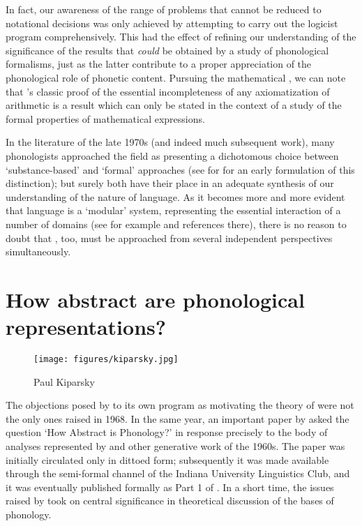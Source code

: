 In fact, our awareness of the range of problems that cannot be reduced
to notational decisions was only achieved by attempting to carry out
the logicist program comprehensively. This had the effect of refining
our understanding of the significance of the results that \emph{could}
be obtained by a study of phonological formalisms, just as the latter
contribute to a proper appreciation of the phonological role of
phonetic content. Pursuing the mathematical , we can note that
's classic proof of the essential incompleteness of any
axiomatization of arithmetic is a result which can only be stated in
the context of a study of the formal properties of mathematical
expressions.

In the literature of the late 1970s (and indeed much subsequent work),
many phonologists approached the field as presenting a dichotomous
choice between `substance-based' and `formal' approaches (see
\citealt{basboll80:copenhagen} for for an early formulation of this
distinction); but surely both have their place in an adequate
synthesis of our understanding of the nature of language. As it
becomes more and more evident that language is a `modular' system,
representing the essential interaction of a number of domains (see for
example \citealt{newmeyer80:gram.thy} and references there), there is
no reason to doubt that , too, must be approached from
several independent perspectives simultaneously.

\section{How abstract are phonological representations?}
\label{sec:abstractness}

\begin{wrapfigure}{l}{.35\textwidth}
  \texttt{[image: figures/kiparsky.jpg]}
  \caption{Paul Kiparsky}
  \label{fig:ch.spe.kiparsky}
\end{wrapfigure}
The objections posed by \textsl{} to its own program as motivating
the theory of  were not the only ones raised in 1968. In the
same year, an important paper by  asked the question `How
Abstract is Phonology?' in response precisely to the body of analyses
represented by \textsl{} and other generative work of the
1960s. The paper was initially circulated only in dittoed form;
subsequently it was made available through the semi-formal channel of
the Indiana University Linguistics Club, and it was eventually
published formally as Part 1 of \citealt{kiparsky:3dimensions}. In a
short time, the issues raised by {\Kiparsky} took on central significance
in theoretical discussion of the bases of phonology.


